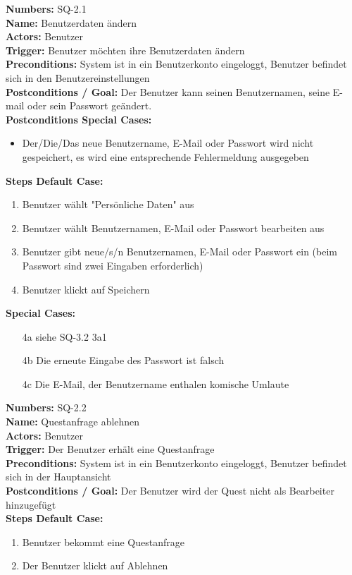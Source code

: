 \documentclass{article}
\begin{document}
\newpage



\begin{samepage}
\textbf{Numbers:} SQ-2.1\\
\textbf{Name:} Benutzerdaten ändern\\
\textbf{Actors:} Benutzer\\
\textbf{Trigger:} Benutzer möchten ihre Benutzerdaten ändern\\
\textbf{Preconditions:}  System ist in ein Benutzerkonto eingeloggt, Benutzer befindet sich in den Benutzereinstellungen\\
\textbf{Postconditions / Goal:} Der Benutzer kann seinen Benutzernamen, seine E-mail oder sein Passwort geändert.\\
\textbf{Postconditions Special Cases:}
\begin{itemize}
    \item Der/Die/Das neue Benutzername, E-Mail oder Passwort wird nicht gespeichert, es wird eine entsprechende Fehlermeldung ausgegeben
\end{itemize}
\textbf{Steps Default Case:}
\begin{enumerate}
    \item Benutzer wählt "Persönliche Daten" aus
    \item Benutzer wählt Benutzernamen, E-Mail oder Passwort bearbeiten aus
    \item Benutzer gibt neue/s/n Benutzernamen, E-Mail oder Passwort ein (beim Passwort sind zwei Eingaben erforderlich)
    \item Benutzer klickt auf Speichern
\end{enumerate}
\textbf{Special Cases:}
\begin{itemize}
    \item [4a] siehe SQ-3.2 3a1
	\item [4b] Die erneute Eingabe des Passwort ist falsch
	\item [4c] Die E-Mail, der Benutzername enthalen komische Umlaute
\end{itemize}
\end{samepage}

\newpage

\begin{samepage}
\textbf{Numbers:} SQ-2.2\\
\textbf{Name:} Questanfrage ablehnen\\
\textbf{Actors:}	Benutzer\\
\textbf{Trigger:} Der Benutzer erhält eine Questanfrage\\
\textbf{Preconditions:} System ist in ein Benutzerkonto eingeloggt, Benutzer befindet sich in der Hauptansicht\\
\textbf{Postconditions / Goal:} Der Benutzer wird der Quest nicht als Bearbeiter hinzugefügt\\
\textbf{Steps Default Case:}
\begin{enumerate}
	\item Benutzer bekommt eine Questanfrage
	\item Der Benutzer klickt auf Ablehnen
\end{enumerate}
\end{samepage}
\end{document}
